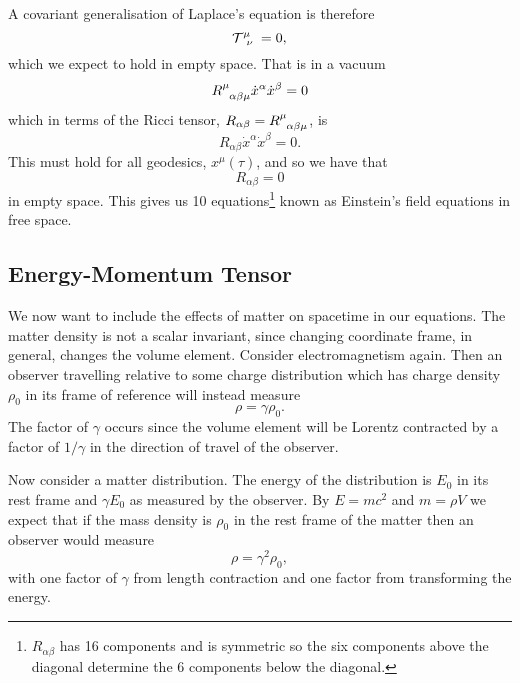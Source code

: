 \documentclass[fleqn]{NotesClass}
\begin{document}
    A covariant generalisation of Laplace's equation is therefore
    \begin{equation}
        \tensor{\mathcal{T}}{^\mu_\nu} = 0,
    \end{equation}
    which we expect to hold in empty space.
    That is in a vacuum
    \begin{equation}
        \tensor{R}{^\mu_{\alpha\beta\mu}}\dot{x}^\alpha\dot{x}^\beta = 0
    \end{equation}
    which in terms of the Ricci tensor, \(R_{\alpha\beta} = \tensor{R}{^\mu_{\alpha\beta\mu}}\), is
    \begin{equation}
        R_{\alpha\beta}\dot{x}^\alpha \dot{x}^\beta = 0.
    \end{equation}
    This must hold for all geodesics, \(x^\mu(\tau)\), and so we have that 
    \begin{equation}
        R_{\alpha\beta} = 0
    \end{equation}
    in empty space.
    This gives us 10 equations\footnote{\(R_{\alpha\beta}\) has 16 components and is symmetric so the six components above the diagonal determine the 6 components below the diagonal.} known as Einstein's field equations in free space.
    
    \subsection{Energy-Momentum Tensor}
    We now want to include the effects of matter on spacetime in our equations.
    The matter density is not a scalar invariant, since changing coordinate frame, in general, changes the volume element.
    Consider electromagnetism again.
    Then an observer travelling relative to some charge distribution which has charge density \(\rho_0\) in its frame of reference will instead measure
    \begin{equation}
        \rho = \gamma\rho_0.
    \end{equation}
    The factor of \(\gamma\) occurs since the volume element will be Lorentz contracted by a factor of \(1/\gamma\) in the direction of travel of the observer.
    
    Now consider a matter distribution.
    The energy of the distribution is \(E_0\) in its rest frame and \(\gamma E_0\) as measured by the observer.
    By \(E = mc^2\) and \(m = \rho V\) we expect that if the mass density is \(\rho_0\) in the rest frame of the matter then an observer would measure
    \begin{equation}
        \rho = \gamma^2\rho_0,
    \end{equation}
    with one factor of \(\gamma\) from length contraction and one factor from transforming the energy.
    
\end{document}
